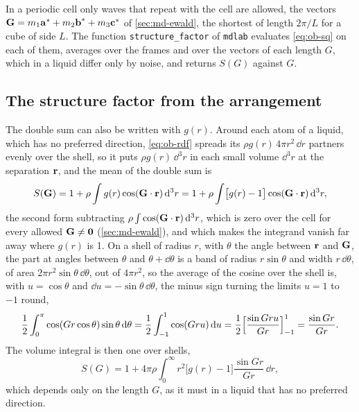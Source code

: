 In a periodic cell only waves that repeat with the cell are allowed, the
vectors $\bm{\mathrm{G}} = m_1\bm{\mathrm{a}}^* + m_2\bm{\mathrm{b}}^* + m_3\bm{\mathrm{c}}^*$ of
\cref{sec:md-ewald}, the shortest of length $2\pi/L$ for a cube of side
$L$. The function \texttt{structure\_factor} of \texttt{mdlab} evaluates
\cref{eq:ob-sq} on each of them, averages over the frames and over the
vectors of each length $G$, which in a liquid differ only by noise, and
returns $S(G)$ against $G$.

\subsection*{The structure factor from the arrangement}

The double sum can also be written with $g(r)$. Around each atom of a
liquid, which has no preferred direction, \cref{eq:ob-rdf} spreads its
$\rho g(r)\,4\pi r^2\,\dd r$ partners evenly over the shell, so it puts
$\rho g(r)\,\dd^3r$ in each small volume $\dd^3r$ at the separation
$\bm{\mathrm{r}}$, and the mean of the double sum is
\begin{equation*}
   S(\bm{\mathrm{G}}) = 1 + \rho\int g(r)\cos(\bm{\mathrm{G}}\cdot\bm{\mathrm{r}})\,\mathrm{d}^3r
   = 1 + \rho\int\bigl[g(r) - 1\bigr]\cos(\bm{\mathrm{G}}\cdot\bm{\mathrm{r}})\,\mathrm{d}^3r ,
\end{equation*}
the second form subtracting $\rho\int\cos(\bm{\mathrm{G}}\cdot\bm{\mathrm{r}})\,\mathrm{d}^3r$,
which is zero over the cell for every allowed $\bm{\mathrm{G}} \neq \bm{\mathrm{0}}$
(\cref{sec:md-ewald}), and which makes the integrand vanish far away
where $g(r)$ is 1. On a shell of radius $r$, with $\theta$ the angle
between $\bm{\mathrm{r}}$ and $\bm{\mathrm{G}}$, the part at angles between $\theta$ and
$\theta + \dd\theta$ is a band of radius $r\sin\theta$ and width
$r\,\dd\theta$, of area $2\pi r^2\sin\theta\,\dd\theta$, out of $4\pi
r^2$, so the average of the cosine over the shell is, with $u =
\cos\theta$ and $\dd u = -\sin\theta\,\dd\theta$, the minus sign turning
the limits $u = 1$ to $-1$ round,
\begin{equation*}
   \frac12\int_0^\pi\cos(Gr\cos\theta)\sin\theta\,\mathrm{d}\theta
   = \frac12\int_{-1}^{1}\cos(Gru)\,\mathrm{d} u
   = \frac12\Bigl[\frac{\sin Gru}{Gr}\Bigr]_{-1}^{1}
   = \frac{\sin Gr}{Gr} .
\end{equation*}
The volume integral is then one over shells,
\begin{equation}
   S(G) = 1 + 4\pi\rho\int_0^\infty r^2\bigl[g(r) - 1\bigr]
   \frac{\sin Gr}{Gr}\,\dd r ,
   \label{eq:ob-sq-rdf}
\end{equation}
which depends only on the length $G$, as it must in a liquid that has no
preferred direction.

